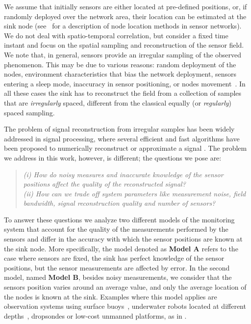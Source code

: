 \documentclass[final, a4paper]{IEEEtran}
\begin{document}
We assume that initially sensors are either located at pre-defined positions, or, if randomly deployed over the
network area, their location
can be estimated at the sink node (see~\cite{Hightower01,Hu04,Moore04} for
a description of node location methods in sensor networks).
We do not deal with spatio-temporal correlation, but
consider a fixed time instant and focus on
the spatial sampling and reconstruction of the sensor field.
We note that, in general, sensors provide an irregular sampling of the observed phenomenon.
This may be due to various reasons: random deployment of the nodes,
environment characteristics that bias the network deployment,
sensors entering a sleep mode, inaccuracy in sensor positioning, or
nodes movement~\cite{Ganesan03}. In all these cases the sink has to
reconstruct the field from a collection of samples that are {\em
irregularly} spaced, different from the classical equally (or {\em regularly}) spaced sampling.

The problem of signal reconstruction from irregular samples has been
widely addressed in signal processing, where several efficient and
fast algorithms have been proposed to numerically reconstruct or
approximate a signal \cite{Feichtinger95,Grochenig99}. The problem
we address in this work, however, is different; the questions we
pose are:
\begin{quote}
{\em (i) How do noisy measures and inaccurate knowledge of
the sensor positions affect the quality of the reconstructed signal?}\\
{\em (ii) How can we trade off system parameters like measurement
noise, field bandwidth, signal reconstruction quality and number of
sensors?}
\end{quote}

To answer these questions we analyze two different models of the monitoring system that account for
the quality of the measurements performed by the sensors and differ in
the accuracy with which the sensor positions are known at the sink node.
More specifically, the model denoted as {\bf Model A} refers to the case
where sensors are fixed, the sink has perfect knowledge of the sensor positions,
but the sensor measurements are affected by error. In the second model, named {\bf Model B},
besides noisy measurements, we consider that the sensors position varies around an average
value, and only the average location of the nodes is known at the sink.
Examples where this model applies are observation systems using surface
buoys~\cite{AOSN}, underwater robots located at different depths~\cite{Bokser04,Cayirci06},
dropsondes or low-cost unmanned platforms, as in \cite{Majumdar06}.
\end{document}
